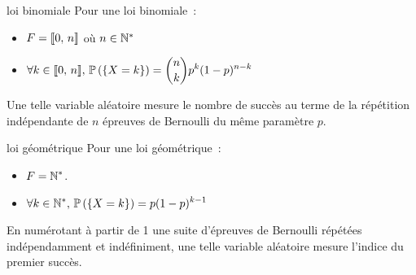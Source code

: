 \begin{exemple}{}{loi binomiale}
    Pour une loi binomiale~:
    \begin{itemize}
        \item $\displaystyle F = \llbracket 0 ,\, n \rrbracket$ où $n \in \mathbb{N}^*$
        \item $\displaystyle \forall k \in \llbracket 0 ,\, n \rrbracket,\, \mathbb{P}\left(\left\{X = k\right\}\right) = \binom{n}{k}p^k(1-p)^{n-k}$
    \end{itemize}
    Une telle variable aléatoire mesure le nombre de succès au terme de la répétition indépendante de $n$ épreuves de Bernoulli du même paramètre $p$.
\end{exemple}

\begin{exemple}{}{loi géométrique}
    Pour une loi géométrique~:
    \begin{itemize}
        \item $\displaystyle F = \mathbb{N}^*$.
        \item $\displaystyle \forall k \in \mathbb{N}^*,\, \mathbb{P}\left(\left\{X = k\right\}\right) = p (1-p)^{k-1}$
    \end{itemize}
    En numérotant à partir de 1 une suite d'épreuves de Bernoulli répétées indépendamment et indéfiniment, une telle variable aléatoire mesure l'indice du premier succès. 
\end{exemple}

